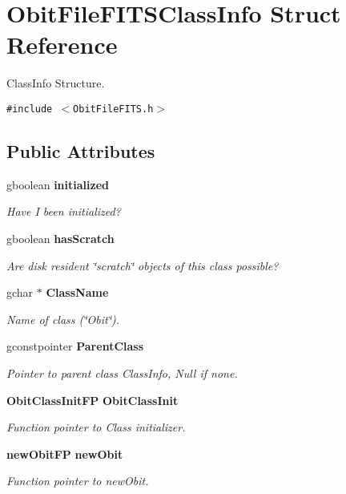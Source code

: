 \section{Obit\-File\-FITSClass\-Info Struct Reference}
\label{structObitFileFITSClassInfo}
Class\-Info Structure.  


{\tt \#include $<$Obit\-File\-FITS.h$>$}

\subsection*{Public Attributes}
\begin{CompactItemize}
\item 
gboolean {\bf initialized}
\begin{CompactList}\small\item\em Have I been initialized? \item\end{CompactList}\item 
gboolean {\bf has\-Scratch}
\begin{CompactList}\small\item\em Are disk resident \char`\"{}scratch\char`\"{} objects of this class possible? \item\end{CompactList}\item 
gchar $\ast$ {\bf Class\-Name}
\begin{CompactList}\small\item\em Name of class (\char`\"{}Obit\char`\"{}). \item\end{CompactList}\item 
gconstpointer {\bf Parent\-Class}
\begin{CompactList}\small\item\em Pointer to parent class Class\-Info, Null if none. \item\end{CompactList}\item 
{\bf Obit\-Class\-Init\-FP} {\bf Obit\-Class\-Init}
\begin{CompactList}\small\item\em Function pointer to Class initializer. \item\end{CompactList}\item 
{\bf new\-Obit\-FP} {\bf new\-Obit}
\begin{CompactList}\small\item\em Function pointer to new\-Obit. \item\end{CompactList}\item 

\end{CompactItemize}
